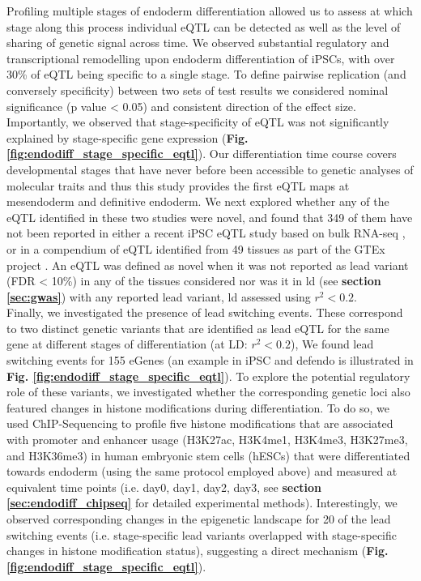 Profiling multiple stages of endoderm differentiation allowed us to assess at which stage along this process individual eQTL can be detected as well as the level of sharing of genetic signal across time. 
We observed substantial regulatory and transcriptional remodelling upon endoderm differentiation of iPSCs, with over 30\% of eQTL being specific to a single stage.
To define pairwise replication (and conversely specificity) between two sets of test results we considered nominal significance (p value < 0.05) and consistent direction of the effect size.
Importantly, we observed that stage-specificity of eQTL was not significantly explained by stage-specific gene expression (\textbf{Fig. \ref{fig:endodiff_stage_specific_eqtl}}).
Our differentiation time course covers developmental stages that have never before been accessible to genetic analyses of molecular traits and thus this study provides the first eQTL maps at mesendoderm and definitive endoderm.
We next explored whether any of the eQTL identified in these two studies were novel, and found that 349 of them have not been reported in either a recent iPSC eQTL study based on bulk RNA-seq \cite{mirauta2018population}, or in a compendium of eQTL identified from 49 tissues as part of the GTEx project \cite{gtex2017genetic}.
An eQTL was defined as novel when it was not reported as lead variant (FDR < 10\%) in any of the tissues considered nor was it in \gls{ld} (see \textbf{section \ref{sec:gwas}}) with any reported lead variant, \gls{ld} assessed using $r^2<0.2$.\\

Finally, we investigated the presence of lead switching events.
These correspond to two distinct genetic variants that are identified as lead eQTL for the same gene at different stages of differentiation (at LD: $r^2<0.2$),
We found lead switching events for 155 eGenes (an example in iPSC and defendo is illustrated in \textbf{Fig. \ref{fig:endodiff_stage_specific_eqtl}}). 
To explore the potential regulatory role of these variants, we investigated whether the corresponding genetic loci also featured changes in histone modifications during differentiation. 
To do so, we used ChIP-Sequencing to profile five histone modifications that are associated with promoter and enhancer usage (H3K27ac, H3K4me1, H3K4me3, H3K27me3, and H3K36me3) in human embryonic stem cells (hESCs) that were differentiated towards endoderm (using the same protocol employed above) and measured at equivalent time points (i.e. day0, day1, day2, day3, see \textbf{section \ref{sec:endodiff_chipseq}} for detailed experimental methods). 
Interestingly, we observed corresponding changes in the epigenetic landscape for 20 of the lead switching events (i.e. stage-specific lead variants overlapped with stage-specific changes in histone modification status), suggesting a direct mechanism (\textbf{Fig. \ref{fig:endodiff_stage_specific_eqtl}}).

